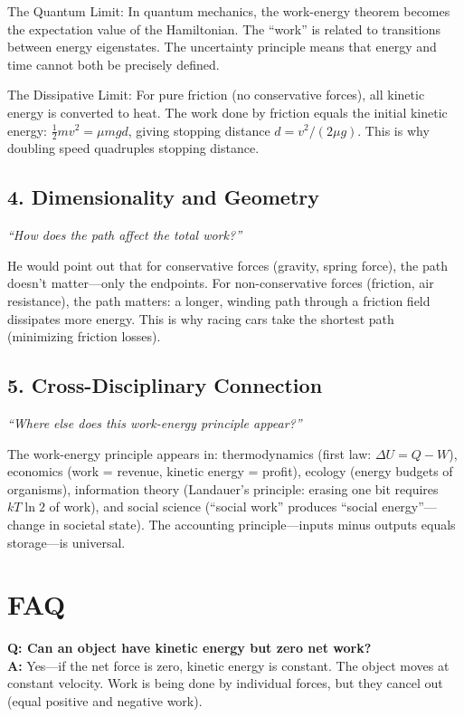\documentclass[11pt,openright]{book}
\begin{document}
The Quantum Limit: In quantum mechanics, the work-energy theorem becomes the expectation value of the Hamiltonian. The ``work'' is related to transitions between energy eigenstates. The uncertainty principle means that energy and time cannot both be precisely defined.

The Dissipative Limit: For pure friction (no conservative forces), all kinetic energy is converted to heat. The work done by friction equals the initial kinetic energy: $\frac{1}{2}mv^2 = \mu mgd$, giving stopping distance $d = v^2/(2\mu g)$. This is why doubling speed quadruples stopping distance.

\subsection*{4. Dimensionality and Geometry}
\textit{``How does the path affect the total work?''}

He would point out that for conservative forces (gravity, spring force), the path doesn't matter---only the endpoints. For non-conservative forces (friction, air resistance), the path matters: a longer, winding path through a friction field dissipates more energy. This is why racing cars take the shortest path (minimizing friction losses).

\subsection*{5. Cross-Disciplinary Connection}
\textit{``Where else does this work-energy principle appear?''}

The work-energy principle appears in: thermodynamics (first law: $\Delta U = Q - W$), economics (work = revenue, kinetic energy = profit), ecology (energy budgets of organisms), information theory (Landauer's principle: erasing one bit requires $kT \ln 2$ of work), and social science (``social work'' produces ``social energy''---change in societal state). The accounting principle---inputs minus outputs equals storage---is universal.
\section*{FAQ}

\textbf{Q: Can an object have kinetic energy but zero net work?}\\
\textbf{A:} Yes---if the net force is zero, kinetic energy is constant. The object moves at constant velocity. Work is being done by individual forces, but they cancel out (equal positive and negative work).
\end{document}
